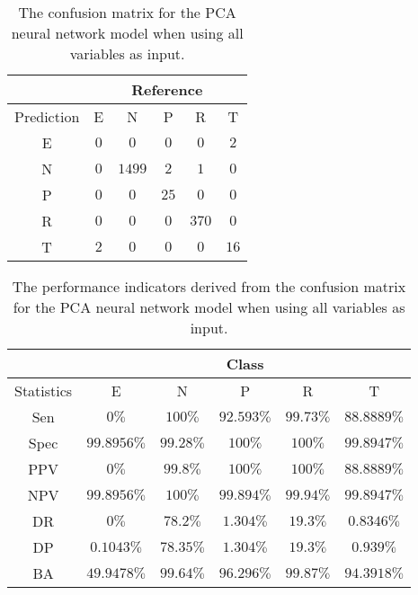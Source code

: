 \begin{table}[!ht]
	\centering
	\begin{tabular}{|c|c|c|c|c|c|}
		\hline
		 & \multicolumn{5}{|c|}{Reference} \\ \hline
		 Prediction & E & N & P & R & T \\ \hline
		 E & $0$ & $0$ & $0$ & $0$ & $2$ \\ \hline
		 N & $0$ & $1499$ & $2$ & $1$ & $0$ \\ \hline
		 P & $0$ & $0$ & $25$ & $0$ & $0$ \\ \hline
		 R & $0$ & $0$ & $0$ & $370$ & $0$ \\ \hline
		 T & $2$ & $0$ & $0$ & $0$ & $16$ \\ \hline
	\end{tabular}
	\caption{The confusion matrix for the PCA neural network model when using all variables as input.}
	\label{tab:cm:all:pcaNNet}
\end{table}

\begin{table}[!ht]
	\centering
	\begin{tabular}{|c|c|c|c|c|c|}
		\hline
		 & \multicolumn{5}{c|}{Class} \\ \hline
		Statistics & E & N & P & R & T \\ \hline
		Sen & $0\%$ & $100\%$ & $92.593\%$ & $99.73\%$ & $88.8889\%$ \\ \hline
		Spec & $99.8956\%$ & $99.28\%$ & $100\%$ & $100\%$ & $99.8947\%$ \\ \hline
		PPV & $0\%$ & $99.8\%$ & $100\%$ & $100\%$ & $88.8889\%$ \\ \hline
		NPV & $99.8956\%$ & $100\%$ & $99.894\%$ & $99.94\%$ & $99.8947\%$ \\ \hline
		DR & $0\%$ & $78.2\%$ & $1.304\%$ & $19.3\%$ & $0.8346\%$ \\ \hline
		DP & $0.1043\%$ & $78.35\%$ & $1.304\%$ & $19.3\%$ & $0.939\%$ \\ \hline
		BA & $49.9478\%$ & $99.64\%$ & $96.296\%$ & $99.87\%$ & $94.3918\%$ \\ \hline
	\end{tabular}
	\caption{The performance indicators derived from the confusion matrix for the PCA neural network model when using all variables as input.}
	\label{tab:cs:reverse:all:pcaNNet}
\end{table}

